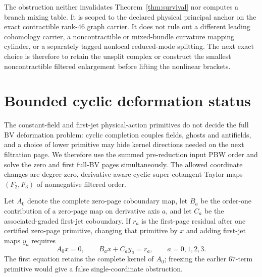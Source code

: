 \documentclass[11pt]{article}
\theoremstyle{definition}
\theoremstyle{remark}
\begin{document}
The obstruction neither invalidates Theorem~\ref{thm:survival} nor computes a
branch mixing table.  It is scoped to the declared physical principal anchor
on the exact contractible rank-$46$ graph carrier.  It does not rule out a
different leading cohomology carrier, a noncontractible or mixed-bundle
curvature mapping cylinder, or a separately tagged nonlocal reduced-mode
splitting.  The next exact choice is therefore to retain the unsplit complex
or construct the smallest noncontractible filtered enlargement before lifting
the nonlinear brackets.

\section{Bounded cyclic deformation status}\label{sec:filtered-obstruction}

The constant-field and first-jet physical-action primitives do not decide the
full BV deformation problem: cyclic completion couples fields, ghosts and
antifields, and a choice of lower primitive may hide kernel directions needed
on the next filtration page.  We therefore use the summed pre-reduction input
PBW order and solve the zero and first full-BV pages simultaneously.  The
allowed coordinate changes are degree-zero, derivative-aware cyclic
super-cotangent Taylor maps $(F_2,F_3)$ of nonnegative filtered order.

Let $A_0$ denote the complete zero-page coboundary map, let $B_a$ be the
order-one contribution of a zero-page map on derivative axis $a$, and let
$C_a$ be the associated-graded first-jet coboundary.  If $r_a$ is the
first-page residual after one certified zero-page primitive, changing that
primitive by $x$ and adding first-jet maps $y_a$ requires
\begin{equation}\label{eq:coupled-filtered-system}
 A_0x=0,
 \qquad B_ax+C_ay_a=r_a,
 \qquad a=0,1,2,3.
\end{equation}
The first equation retains the complete kernel of $A_0$; freezing the earlier
$67$-term primitive would give a false single-coordinate obstruction.
\end{document}
